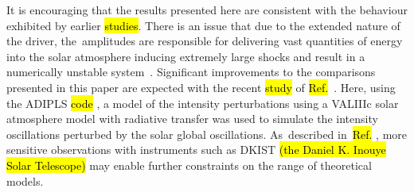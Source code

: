\documentclass[physics,article,accept,pdftex,moreauthors]{Definitions/mdpi}
\begin{document}
It is encouraging that the results presented here are consistent with the behaviour exhibited by earlier \hl{studies}.
There is an issue that due to the extended nature of the driver, the~amplitudes are responsible for delivering vast quantities of energy into the solar atmosphere inducing extremely large shocks and result in a numerically unstable system~\cite{Santamaria2015}. Significant improvements to the comparisons presented in this paper are expected with the  recent 
 \hl{study} of \hl{Ref.}~\cite{Kostogryz2021}. Here, using the ADIPLS \hl{code} %
\cite{Christensen-Dalsgaard2008}, a model of the intensity 
perturbations 
using a VALIIIc solar atmosphere model with radiative transfer was used to simulate the intensity oscillations perturbed by the solar global oscillations. As~described 
in~\hl{Ref.} 
, more sensitive observations with instruments such as DKIST \hl{(the Daniel K. Inouye Solar Telescope)} %
may enable further constraints on the range of theoretical models. 








\vspace{6pt}
\end{document}
